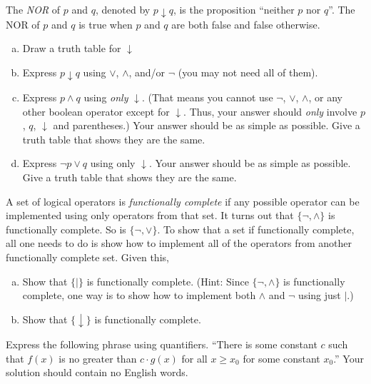 \begin{pro}
 The {\em NOR} of $p$ and $q$, denoted by $p \downarrow q$, is the proposition ``neither  $p$ nor $q$''. 
The NOR of $p$ and $q$ is true when $p$ and $q$ are both false and false otherwise.
\begin{enumerate}[(a)]
\item Draw a truth table for $\downarrow$
\item Express $p\downarrow q$ using $\vee$, $\wedge$, and/or $\neg$ (you may not need all of them).
\item Express $p\wedge q$ using {\em only} $\downarrow$. 
(That means you cannot use $\neg$, $\vee$, $\wedge$, or any other
boolean operator except for $\downarrow$. Thus, your answer should {\em only} involve $p$, $q$, $\downarrow$ and parentheses.)
Your answer should be as simple as possible.  Give a truth table that shows they are the same.
\item Express $\neg p \vee q$ using only $\downarrow$. Your answer should be as simple as possible.  Give a truth table that shows they are the same.
\end{enumerate}
\end{pro}

\begin{pro}
A set of logical operators is {\em functionally complete} if any possible operator can be implemented using only 
operators from that set.  It turns out that $\{\neg,\wedge\}$ is functionally complete.  So is  $\{\neg,\vee\}$.
To show that a set if functionally complete, all one needs to do is show how to implement all of the operators
from another functionally complete set.  Given this,
\begin{enumerate}[(a)]
\item
Show that $\{|\}$ is functionally complete.
(Hint: Since $\{\neg,\wedge\}$ is functionally complete, 
one way is to show how to implement both $\wedge$ and $\neg$ using just $|$.)
\item
Show that $\{\downarrow \}$ is functionally complete. 
\end{enumerate}
\end{pro}


\begin{pro}
Express the following phrase using quantifiers.
``There is some constant $c$ such that 
$f(x)$ is no greater than $c\cdot g(x)$ for all $x\geq x_0$ for some constant $x_0$.''
Your solution should contain no English words.
\end{pro}

